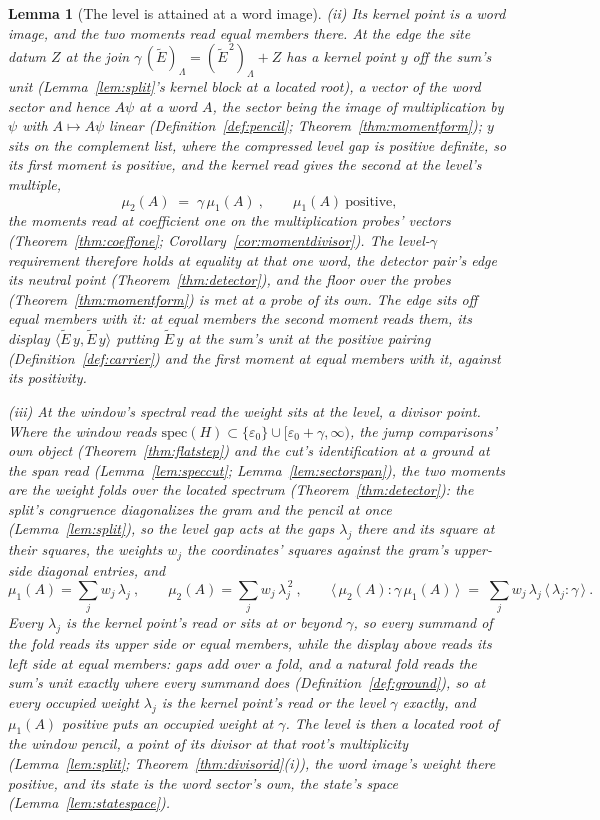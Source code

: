 \documentclass[11pt]{article}
\newtheorem{lemma}{Lemma}
\theoremstyle{definition}
\begin{document}
\begin{lemma}[The level is attained at a word image]
\emph{(ii) Its kernel point is a word image, and the two moments read
equal members there.} At the edge the site datum $Z$ at the join
$\gamma\,(\tilde E)_\Lambda=(\tilde E^{\,2})_\Lambda+Z$ has a kernel
point $y$ off the sum's unit
(Lemma~\ref{lem:split}'s kernel block at a located root), a vector
of the word sector and hence $A\psi$ at a word $A$, the sector being
the image of multiplication by $\psi$ with $A\mapsto A\psi$ linear
(Definition~\ref{def:pencil}; Theorem~\ref{thm:momentform}); $y$
sits on the complement list, where the compressed level gap is
positive definite, so its first moment is positive, and the kernel
read gives the second at the level's multiple,
\[
\mu_2(A)\;=\;\gamma\,\mu_1(A)\ ,
\qquad\mu_1(A)\ \text{positive},
\]
the moments read at coefficient one on the multiplication probes'
vectors (Theorem~\ref{thm:coeffone};
Corollary~\ref{cor:momentdivisor}). The level-$\gamma$ requirement
therefore holds at equality at that one word, the detector pair's
edge its neutral point (Theorem~\ref{thm:detector}), and the floor
over the probes (Theorem~\ref{thm:momentform}) is met at a probe of
its own. The edge sits off equal members with it: at equal members
the second moment reads them, its display
$\langle\tilde E\,y,\tilde E\,y\rangle$ putting $\tilde E\,y$ at the
sum's unit at the positive pairing
(Definition~\ref{def:carrier}) and the first moment at equal members
with it, against its positivity.

\emph{(iii) At the window's spectral read the weight sits at the level, a
divisor point.} Where the window reads
$\mathrm{spec}(H)\subset\{\varepsilon_0\}\cup
[\varepsilon_0+\gamma,\infty)$, the jump comparisons' own object
(Theorem~\ref{thm:flatstep}) and the cut's identification at a
ground at the span read (Lemma~\ref{lem:speccut};
Lemma~\ref{lem:sectorspan}), the two moments are the weight folds
over the located spectrum (Theorem~\ref{thm:detector}): the split's
congruence diagonalizes the gram and the pencil at once
(Lemma~\ref{lem:split}), so the level gap acts at the gaps
$\lambda_j$ there and its square at their squares, the weights $w_j$
the coordinates' squares against the gram's upper-side diagonal
entries, and
\[
\mu_1(A)=\sum_jw_j\,\lambda_j\ ,\qquad
\mu_2(A)=\sum_jw_j\,\lambda_j^{\,2}\ ,\qquad
\big\langle\,\mu_2(A)\!:\!\gamma\,\mu_1(A)\,\big\rangle
\;=\;\sum_j w_j\,\lambda_j\,
\big\langle\,\lambda_j\!:\!\gamma\,\big\rangle\ .
\]
Every $\lambda_j$ is the kernel point's read or sits at or beyond
$\gamma$, so every summand of the fold reads its upper side or equal
members, while the display above reads its left side at equal
members: gaps add over a fold, and a natural fold reads the sum's
unit exactly where every summand does
(Definition~\ref{def:ground}), so at every occupied weight
$\lambda_j$ is the kernel point's read or the level $\gamma$
exactly, and $\mu_1(A)$ positive puts an occupied weight at
$\gamma$. The level is then a located root of the window pencil, a
point of its divisor at that root's multiplicity
(Lemma~\ref{lem:split}; Theorem~\ref{thm:divisorid}(i)), the word
image's weight there positive, and its state is the word sector's
own, the state's space (Lemma~\ref{lem:statespace}).


\end{lemma}
\end{document}
